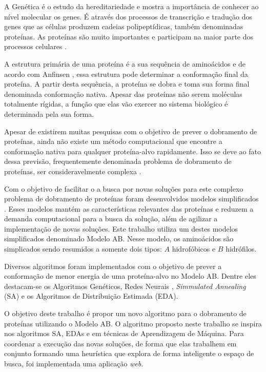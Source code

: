 \documentclass[dm,ppgcomp]{texfurg}
\begin{document}
A Genética é o estudo da hereditariedade e mostra a importância de conhecer ao nível molecular os genes. É através dos processos de transcrição e tradução dos genes que as células produzem cadeias polipeptídicas, também denominadas proteínas. As proteínas são muito importantes e participam na maior parte dos processos celulares \cite{hunter1993molecular}.

A estrutura primária de uma proteína é a sua sequência de aminoácidos e de acordo com Anfinsen \cite{anfinsen1973principles}, essa estrutura pode determinar a conformação final da proteína. A partir desta sequência, a proteína se dobra e toma sua forma final denominada conformação nativa. Apesar das proteínas não serem moléculas totalmente rígidas, a função que elas vão exercer no sistema biológico é determinada pela sua forma. 

Apesar de existirem muitas pesquisas com o objetivo de prever o dobramento de proteínas, ainda não existe um método computacional que encontre a conformação nativa para qualquer proteína-alvo rapidamente. Isso se deve ao fato dessa previsão, frequentemente denominada problema de dobramento de proteínas, ser consideravelmente complexa \cite{fraenkel1993complexity}.

Com o objetivo de facilitar o a busca por novas soluções para este complexo problema de dobramento de proteínas foram desenvolvidos modelos simplificados \cite{stillinger1993toy}. Esses modelos mantém as características relevantes das proteínas e reduzem a demanda computacional para a busca da solução, além de agilizar a implementação de novas soluções. Este trabalho utiliza um destes modelos simplificados denominado Modelo AB. Nesse modelo, os aminoácidos são simplicados sendo resumidos a somente dois tipos: $A$ hidrofóbicos e $B$ hidrófilos.

Diversos algoritmos foram implementados com o objetivo de prever a conformação de menor energia de uma proteína-alvo no Modelo AB. Dentre eles destacam-se os Algoritmos Genéticos, Redes Neurais \cite{stillinger1995collective}, {\it Simmulated Annealing} (SA) e os Algoritmos de Distribuição Estimada (EDA). 

O objetivo deste trabalho é propor um novo algoritmo para o dobramento de proteínas utilizando o Modelo AB. O algoritmo proposto neste trabalho se inspira nos algoritmos SA, EDAs e em técnicas de Aprendizagem de Máquina. Para coordenar a execução das novas soluções, de forma que elas trabalhem em conjunto formando uma heurística que explora de forma inteligente o espaço de busca, foi implementada uma aplicação {\it web}.
\end{document}
